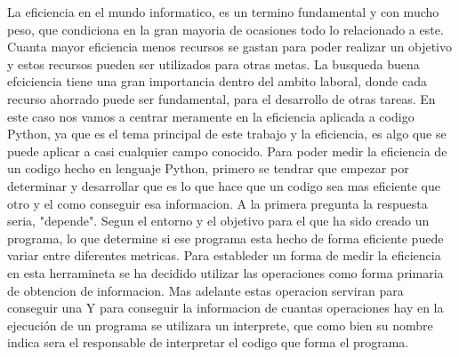 
La eficiencia en el mundo informatico, es un termino fundamental y con mucho peso, que condiciona en la gran mayoria de ocasiones todo lo relacionado a este. Cuanta mayor eficiencia menos recursos se gastan para poder realizar un objetivo y estos recursos pueden ser utilizados para otras metas. 
La busqueda buena efciciencia tiene una gran importancia dentro del ambito laboral, donde cada recurso ahorrado puede ser fundamental, para el desarrollo de otras tareas.
En este caso nos vamos a centrar meramente en la eficiencia aplicada a codigo Python, ya que es el tema principal de este trabajo y la eficiencia, es algo que se puede aplicar a casi cualquier campo conocido. 
Para poder medir la eficiencia de un codigo hecho en lenguaje Python, primero se tendrar que empezar por determinar y desarrollar que es lo que hace que un codigo sea mas eficiente que otro y el como conseguir esa informacion.
A la primera pregunta la respuesta seria, "depende". Segun el entorno y el objetivo para el que ha sido creado un programa, lo que determine si ese programa esta hecho de forma eficiente puede variar entre diferentes metricas. Para estableder un forma de medir la eficiencia en esta herramineta se ha decidido utilizar las operaciones como forma primaria de obtencion de informacion. Mas adelante estas operacion serviran para conseguir una 
Y para conseguir la informacion de cuantas operaciones hay en la ejecución de un programa se utilizara un interprete, que como bien su nombre indica sera el responsable de interpretar el codigo que forma el programa.


